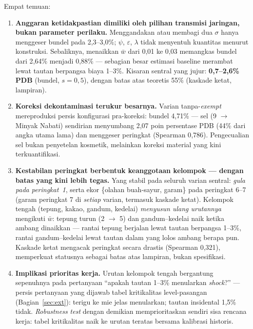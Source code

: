 \documentclass[11pt,a4paper]{article}
\newcommand{\en}[1]{\textit{#1}}   %
\begin{document}
Empat temuan:
\begin{enumerate}[nosep]
\item \textbf{Anggaran ketidakpastian dimiliki oleh pilihan transmisi
      jaringan, bukan parameter perilaku.} Menggandakan atau membagi dua
      $\sigma$ hanya menggeser bundel pada 2{,}3--3{,}0\%; $\psi$,
      $\varepsilon$, $\lambda$ tidak menyentuh kuantitas menurut
      konstruksi. Sebaliknya, menaikkan $\bar w$ dari 0{,}01 ke 0{,}03
      memangkas bundel dari 2{,}64\% menjadi 0{,}88\% --- sebagian besar
      estimasi baseline merambat lewat tautan berpangsa biaya 1--3\%.
      Kisaran sentral yang jujur: \textbf{0{,}7--2{,}6\% PDB} (bundel,
      $s = 0{,}5$), dengan batas atas teoretis 55\% (kaskade ketat,
      lampiran).
\item \textbf{Koreksi dekontaminasi terukur besarnya.} Varian
      tanpa-\en{exempt} mereproduksi persis konfigurasi pra-koreksi:
      bundel 4{,}71\% --- sel (9 $\to$ Minyak Nabati) sendirian
      menyumbang 2{,}07 poin persentase PDB (44\% dari angka utama lama)
      dan menggeser peringkat (Spearman 0{,}786). Pengecualian sel bukan
      penyetelan kosmetik, melainkan koreksi material yang kini
      terkuantifikasi.
\item \textbf{Kestabilan peringkat berbentuk keanggotaan kelompok ---
      dengan batas yang kini lebih tegas.} Yang stabil pada seluruh
      varian sentral: \emph{gula pada peringkat~1}, serta ekor
      \{olahan buah-sayur, garam\} pada peringkat 6--7 (garam peringkat 7
      di \emph{setiap} varian, termasuk kaskade ketat). Kelompok tengah
      (tepung, kakao, gandum, kedelai) \emph{menyusun ulang urutannya}
      mengikuti $\bar w$: tepung turun (2 $\to$ 5) dan gandum--kedelai
      naik ketika ambang dinaikkan --- rantai tepung berjalan lewat
      tautan berpangsa 1--3\%, rantai gandum--kedelai lewat tautan dalam
      yang lolos ambang berapa pun. Kaskade ketat mengacak peringkat
      secara drastis (Spearman 0{,}321), memperkuat statusnya sebagai
      batas atas lampiran, bukan spesifikasi.
\item \textbf{Implikasi prioritas kerja.} Urutan kelompok tengah
      bergantung sepenuhnya pada pertanyaan ``apakah tautan 1--3\%
      menularkan \en{shock}?'' --- persis pertanyaan yang dijawab tabel
      kritikalitas level-pasangan (Bagian~\ref{sec:ext}): terigu ke mie
      jelas menularkan; tautan insidental 1{,}5\% tidak. \en{Robustness
      test} dengan demikian memprioritaskan sendiri sisa rencana kerja:
      tabel kritikalitas naik ke urutan teratas bersama kalibrasi
      historis.
\end{enumerate}
\end{document}
